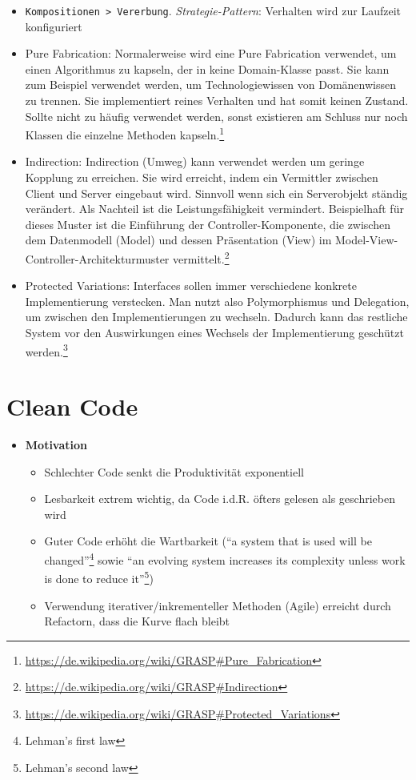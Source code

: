 \begin{itemize}
	\item \texttt{Kompositionen > Vererbung}. \textit{Strategie-Pattern}: Verhalten wird zur Laufzeit konfiguriert
	\item Pure Fabrication: Normalerweise wird eine Pure Fabrication verwendet, um einen Algorithmus zu kapseln, der in keine Domain-Klasse passt. Sie kann zum Beispiel verwendet werden, um Technologiewissen von Domänenwissen zu trennen. Sie implementiert reines Verhalten und hat somit keinen Zustand. Sollte nicht zu häufig verwendet werden, sonst existieren am Schluss nur noch Klassen die einzelne Methoden kapseln.\footnote{\url{https://de.wikipedia.org/wiki/GRASP\#Pure_Fabrication}}
	\item Indirection: Indirection (Umweg) kann verwendet werden um geringe Kopplung zu erreichen. Sie wird erreicht, indem ein Vermittler zwischen Client und Server eingebaut wird. Sinnvoll wenn sich ein Serverobjekt ständig verändert. Als Nachteil ist die Leistungsfähigkeit vermindert. Beispielhaft für dieses Muster ist die Einführung der Controller-Komponente, die zwischen dem Datenmodell (Model) und dessen Präsentation (View) im Model-View-Controller-Architekturmuster vermittelt.\footnote{\url{https://de.wikipedia.org/wiki/GRASP\#Indirection}}
	\item Protected Variations: Interfaces sollen immer verschiedene konkrete Implementierung verstecken. Man nutzt also Polymorphismus und Delegation, um zwischen den Implementierungen zu wechseln. Dadurch kann das restliche System vor den Auswirkungen eines Wechsels der Implementierung geschützt werden.\footnote{\url{https://de.wikipedia.org/wiki/GRASP\#Protected_Variations}}
\end{itemize}



\section{Clean Code}
\begin{itemize}
	\item \textbf{Motivation}
	\begin{itemize}
		\item Schlechter Code senkt die Produktivität exponentiell
		\item Lesbarkeit extrem wichtig, da Code i.d.R. öfters gelesen als geschrieben wird
		\item Guter Code erhöht die Wartbarkeit ("`a system that is used will be changed"'\footnote{Lehman's first law} sowie "`an evolving system increases its complexity unless work is done to reduce it"'\footnote{Lehman's second law})
		\item Verwendung iterativer/inkrementeller Methoden (Agile) erreicht durch Refactorn, dass die Kurve flach bleibt
	\end{itemize}
\end{itemize}


